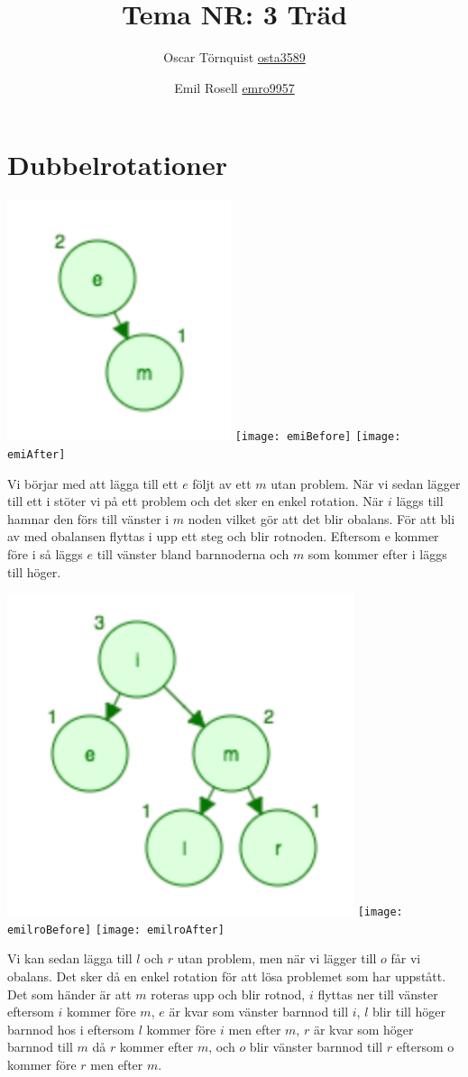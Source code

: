 \documentclass[a5paper,10pt,oneside]{article}
\title{Tema NR: 3 Träd}
\author{Oscar Törnquist \url{osta3589} \and Emil Rosell \url{emro9957}}
\begin{document}
\maketitle

\section*{Dubbelrotationer}

\includegraphics[scale=0.7]{em}
\texttt{[image: emiBefore]}
\texttt{[image: emiAfter]}


Vi börjar med att lägga till ett $e$ följt av ett $m$ utan problem. När vi sedan lägger till ett i stöter vi på ett problem och det sker en enkel rotation. När $i$ läggs till hamnar den förs till vänster i $m$ noden vilket gör att det blir obalans. För att bli av med obalansen flyttas i upp ett steg och blir rotnoden. Eftersom e kommer före i så läggs $e$ till vänster bland barnnoderna och $m$ som kommer efter i läggs till höger. 

\includegraphics[scale=0.45]{emilr}
\texttt{[image: emilroBefore]}
\texttt{[image: emilroAfter]}

Vi kan sedan lägga till $l$ och $r$ utan problem, men när vi lägger till $o$ får vi obalans. Det sker då en enkel rotation för att lösa problemet som har uppstått. Det som händer är att $m$ roteras upp och blir rotnod, $i$ flyttas ner till vänster eftersom $i$ kommer före $m$, $e$ är kvar som vänster barnnod till $i$, $l$ blir till höger barnnod hos i eftersom $l$ kommer före $i$ men efter $m$, $r$ är kvar som höger barnnod till $m$ då $r$ kommer efter $m$, och $o$ blir vänster barnnod till $r$ eftersom o kommer före $r$ men efter $m$.
\end{document}
